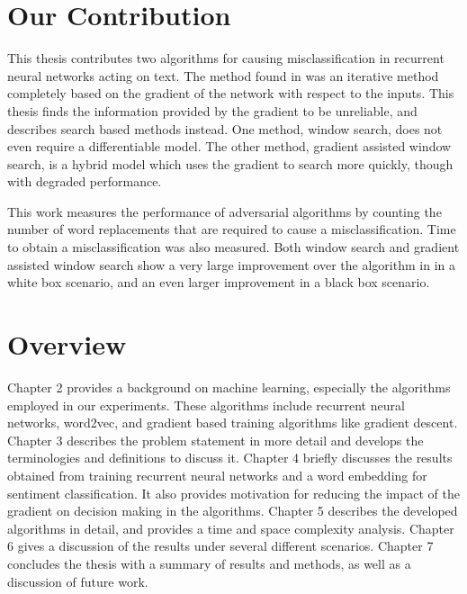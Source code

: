 \section{Our Contribution}
This thesis contributes two algorithms for causing misclassification in recurrent neural networks acting on text.  The method found in \cite{np16} was an iterative method completely based on the gradient of the network with respect to the inputs.  This thesis finds the information provided by the gradient to be unreliable, and describes search based methods instead.  One method, window search, does not even require a differentiable model.  The other method, gradient assisted window search, is a hybrid model which uses the gradient to search more quickly, though with degraded performance.  

This work measures the performance of adversarial algorithms by counting the number of word replacements that are required to cause a misclassification.  Time to obtain a misclassification was also measured.  Both window search and gradient assisted window search show a very large improvement over the algorithm in \cite{np16} in a white box scenario, and an even larger improvement in a black box scenario.

\section{Overview}
Chapter 2 provides a background on machine learning, especially the algorithms employed in our experiments.  These algorithms include recurrent neural networks, word2vec, and gradient based training algorithms like gradient descent.  Chapter 3 describes the problem statement in more detail and develops the terminologies and definitions to discuss it.  Chapter 4 briefly discusses the results obtained from training recurrent neural networks and a word embedding for sentiment classification.  It also provides motivation for reducing the impact of the gradient on decision making in the algorithms.  Chapter 5 describes the developed algorithms in detail, and provides a time and space complexity analysis.  Chapter 6 gives a discussion of the results under several different scenarios.  Chapter 7 concludes the thesis with a summary of results and methods, as well as a discussion of future work.
